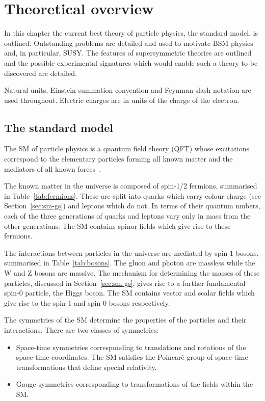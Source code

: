 \chapter{Theoretical overview}
\label{cha:theory}

In this chapter the current best theory of particle physics, the standard model,
is outlined. Outstanding problems are detailed and used to motivate BSM 
physics and, in particular, SUSY. The features of supersymmetric theories are 
outlined and the possible experimental signatures which would enable such a theory to be 
discovered are detailed.

Natural units, Einstein summation convention
and Feynman slash notation are used throughout. Electric charges 
are in units of the charge of the electron.

\section{The standard model}

\label{sec:sm}

The SM of particle physics is a quantum field theory (QFT) whose excitations
correspond to the elementary particles forming all known matter and the mediators of
all known forces~\cite{ftsm}. 

The known matter in the universe is composed of spin-1/2 fermions, summarised 
in Table~\ref{tab:fermions}. These are split into quarks which carry colour charge 
(see Section~\ref{sec:sm-gs}) and leptons which do not. In terms of their
quantum nmbers, each of the three 
generations of quarks and leptons vary only in mass from the other generations. 
The SM contains spinor fields which give rise to these fermions.

The interactions between particles in the universe are mediated by
spin-1 bosons, summarised in Table~\ref{tab:bosons}. 
The gluon and photon are massless while the W and Z bosons are massive. 
The mechanism for determining the masses of these particles, discussed in 
Section~\ref{sec:sm-gs}, gives rise to a further fundamental spin-0 particle, the Higgs boson.
The SM contains vector and scalar fields which give rise to the spin-1 and spin-0
bosons respectively.

The symmetries of the SM determine the properties of the particles and 
their interactions. There are two classes of symmetries:

\begin{itemize}
\item Space-time symmetries corresponding to translations and rotations of the space-time coordinates.
The SM satisfies the Poincar\'{e} group of space-time transformations that define special relativity. 
\item Gauge symmetries corresponding to transformations of the fields within the SM.
\end{itemize}

